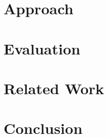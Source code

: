 \section{Approach}
\label{sec:approach}

\section{Evaluation}
\label{sec:evaluation}

\section{Related Work}
\label{sec:related:work}

\section{Conclusion}
\label{sec:conclusion}


%



\newpage
\listoftodos

 